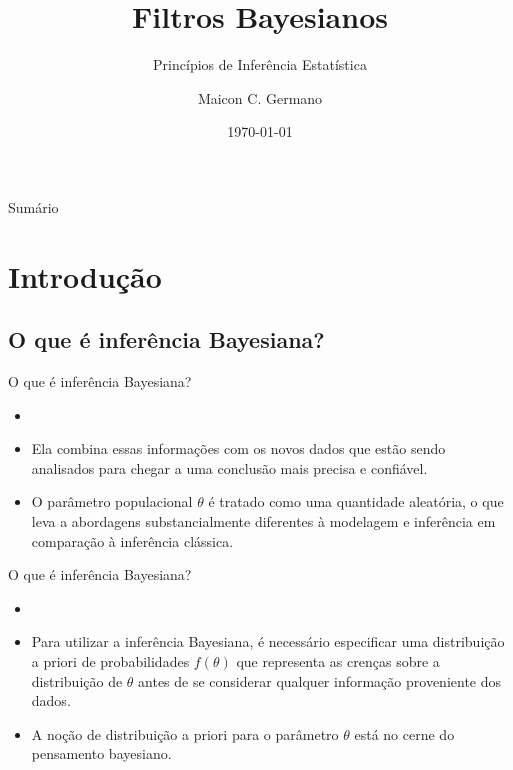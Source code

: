 \documentclass{beamer}
\title{Filtros Bayesianos}
\subtitle{Princípios de Inferência Estatística}
\author{Maicon C. Germano}
\institute{IBB UNESP}
\date{\today}
\theoremstyle{definition}
\begin{document}
\begin{frame}
  \titlepage
\end{frame}

\begin{frame}{Sumário}
  \tableofcontents
\end{frame}

\section{Introdução}

\subsection{O que é inferência Bayesiana?}
\begin{frame}{O que é inferência Bayesiana?}
\begin{itemize}
\item {}
\vspace{0.2cm}
\item Ela combina essas informações com os novos dados que estão sendo analisados para chegar a uma conclusão mais precisa e confiável.
\vspace{0.2cm}
\item O parâmetro populacional $\theta$ é tratado como uma quantidade aleatória, o que leva a abordagens substancialmente diferentes à modelagem e inferência em comparação à inferência clássica.
\end{itemize}
\end{frame}

\begin{frame}{O que é inferência Bayesiana?}
\begin{itemize}
\item {}
\vspace{0.2cm}
\item Para utilizar a inferência Bayesiana, é necessário especificar uma distribuição a priori de probabilidades $f(\theta)$ que representa as crenças sobre a distribuição de $\theta$ antes de se considerar qualquer informação proveniente dos dados.
\vspace{0.2cm}
\item A noção de distribuição a priori para o parâmetro $\theta$ está no cerne do pensamento bayesiano.

\end{itemize}
    
\end{frame}
\end{document}
